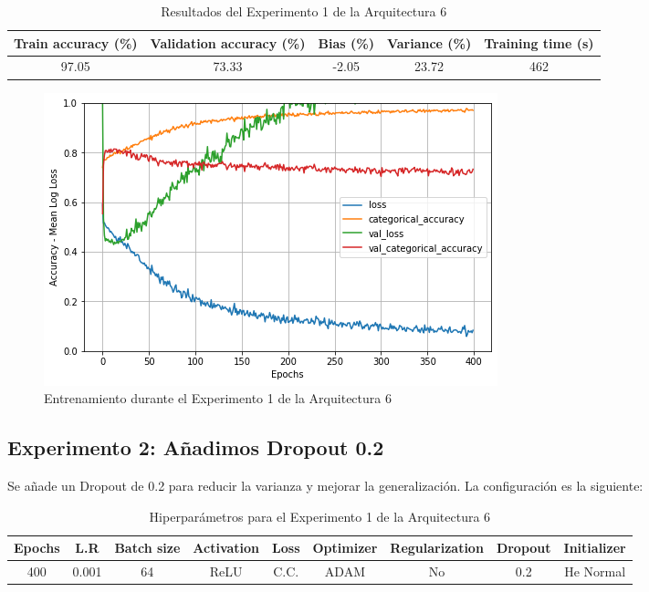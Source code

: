 \documentclass{article}
\begin{document}
            \begin{table}[!h]
				\begin{center}
					\begin{tabular}{| c | c | c | c | c |}
						\textbf{Train accuracy (\%)} & \textbf{Validation accuracy (\%)} & \textbf{Bias (\%)} & \textbf{Variance (\%)} & \textbf{Training time (s)} \\ \hline
						97.05 & 73.33 & -2.05 & 23.72 & 462 \\ \hline
					\end{tabular}
					\caption{Resultados del Experimento 1 de la Arquitectura 6}
					\label{tab:res-b-a6-e1}
				\end{center}
			\end{table}
            
            \begin{figure}[!h]
				\begin{center}
					\includegraphics[scale=0.5]{b-tr-a6-e1.png}		
					\caption{Entrenamiento durante el Experimento 1 de la Arquitectura 6}	
					\label{b-tr-a6-e1}
				\end{center}
			\end{figure}
   
        \subsection{Experimento 2: A\~{n}adimos Dropout 0.2}
        \label{b-s-a6-e2}
            Se a\~{n}ade un Dropout de 0.2 para reducir la varianza y mejorar la generalizaci\'on. La configuraci\'on es la siguiente: 
   
            \begin{table}[!h]
				\begin{tabular}{|c|c|c|c|c|c|c|c|c|}
					\textbf{Epochs}&\textbf{L.R}&\textbf{Batch size}&\textbf{Activation}&\textbf{Loss}&\textbf{Optimizer}&\textbf{Regularization}&\textbf{Dropout}  & \textbf{Initializer} \\ \hline
					400 & 0.001 & 64 & ReLU & C.C. & ADAM & No & 0.2 & He Normal
				\end{tabular}
				\caption{Hiperpar\'ametros para el Experimento 1 de la Arquitectura 6}
				\label{tab:hip-b-a6-e2}
			\end{table}
   
\end{document}
